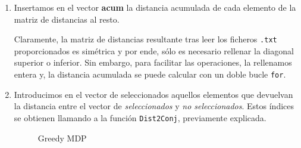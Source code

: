 \begin{enumerate}
	\item Insertamos en el vector \textbf{acum} la distancia acumulada de cada elemento de la matriz de distancias al resto.
	
	Claramente, la matriz de distancias
	resultante tras leer los ficheros \texttt{.txt} proporcionados es simétrica y por ende, sólo es necesario rellenar la diagonal superior o inferior. Sin embargo, para facilitar las operaciones, la rellenamos entera y, la distancia acumulada se puede calcular con un doble bucle \texttt{for}.
	
	
	
	
	\item Introducimos en el vector de 
	seleccionados aquellos elementos que devuelvan la distancia entre el vector de \textit{seleccionados} y \textit{no seleccionados}. Estos índices se obtienen llamando a la función \texttt{Dist2Conj}, previamente explicada. \\
	

\begin{figure}[H]
	\centering
	\begin{minipage}{.7\linewidth}
		
		
	\begin{algorithm}[H] 
		\caption{Greedy MDP}
		\SetAlgoLined
		
		
		
		
	\end{algorithm}

\end{minipage}
\end{figure}

	
\end{enumerate}





